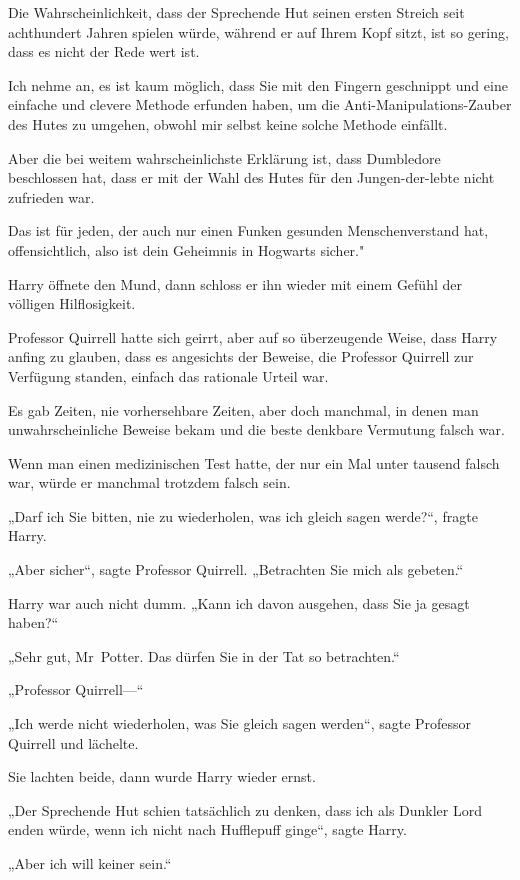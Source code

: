 {Die Wahrscheinlichkeit, dass der Sprechende Hut seinen ersten Streich seit achthundert Jahren spielen würde, während er auf Ihrem Kopf sitzt, ist so gering, dass es nicht der Rede wert ist.

Ich nehme an, es ist kaum möglich, dass Sie mit den Fingern geschnippt und eine einfache und clevere Methode erfunden haben, um die Anti-Manipulations-Zauber des Hutes zu umgehen, obwohl mir selbst keine solche Methode einfällt.

Aber die bei weitem wahrscheinlichste Erklärung ist, dass Dumbledore beschlossen hat, dass er mit der Wahl des Hutes für den Jungen-der-lebte nicht zufrieden war.

Das ist für jeden, der auch nur einen Funken gesunden Menschenverstand hat, offensichtlich, also ist dein Geheimnis in Hogwarts sicher."

Harry öffnete den Mund, dann schloss er ihn wieder mit einem Gefühl der völligen Hilflosigkeit.

Professor Quirrell hatte sich geirrt, aber auf so überzeugende Weise, dass Harry anfing zu glauben, dass es angesichts der Beweise, die Professor Quirrell zur Verfügung standen, einfach das rationale Urteil war.

Es gab Zeiten, nie vorhersehbare Zeiten, aber doch manchmal, in denen man unwahrscheinliche Beweise bekam und die beste denkbare Vermutung falsch war.

Wenn man einen medizinischen Test hatte, der nur ein Mal unter tausend falsch war, würde er manchmal trotzdem falsch sein.

„Darf ich Sie bitten, nie zu wiederholen, was ich gleich sagen werde?“, fragte Harry.

„Aber sicher“, sagte Professor Quirrell. „Betrachten Sie mich als gebeten.“

Harry war auch nicht dumm. „Kann ich davon ausgehen, dass Sie ja gesagt haben?“

„Sehr gut, Mr~Potter. Das dürfen Sie in der Tat so betrachten.“

„Professor Quirrell—“

„Ich werde nicht wiederholen, was Sie gleich sagen werden“, sagte Professor Quirrell und lächelte.

Sie lachten beide, dann wurde Harry wieder ernst.

„Der Sprechende Hut schien tatsächlich zu denken, dass ich als Dunkler Lord enden würde, wenn ich nicht nach Hufflepuff ginge“, sagte Harry.

„Aber ich will keiner sein.“

}
